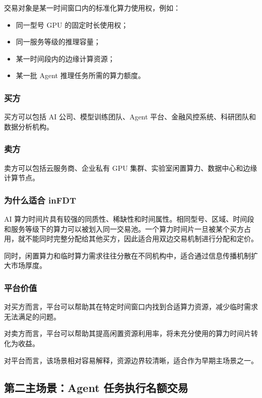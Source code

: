 \documentclass[UTF8,a4paper,12pt]{ctexart}
\begin{document}
交易对象是某一时间窗口内的标准化算力使用权，例如：

\begin{itemize}
    \item 同一型号 GPU 的固定时长使用权；
    \item 同一服务等级的推理容量；
    \item 某一时间段内的边缘计算资源；
    \item 某一批 Agent 推理任务所需的算力额度。
\end{itemize}

\subsubsection*{买方}

买方可以包括 AI 公司、模型训练团队、Agent 平台、金融风控系统、科研团队和数据分析机构。

\subsubsection*{卖方}

卖方可以包括云服务商、企业私有 GPU 集群、实验室闲置算力、数据中心和边缘计算节点。

\subsubsection*{为什么适合 inFDT}

AI 算力时间片具有较强的同质性、稀缺性和时间属性。相同型号、区域、时间段和服务等级下的算力可以被划入同一交易池。一个算力时间片一旦被某个买方占用，就不能同时完整分配给其他买方，因此适合用双边交易机制进行分配和定价。

同时，闲置算力和临时算力需求往往分散在不同机构中，适合通过信息传播机制扩大市场厚度。

\subsubsection*{平台价值}

对买方而言，平台可以帮助其在特定时间窗口内找到合适算力资源，减少临时需求无法满足的问题。

对卖方而言，平台可以帮助其提高闲置资源利用率，将未充分使用的算力时间片转化为收益。

对平台而言，该场景相对容易解释，资源边界较清晰，适合作为早期主场景之一。

\subsection{第二主场景：Agent 任务执行名额交易}
\end{document}
